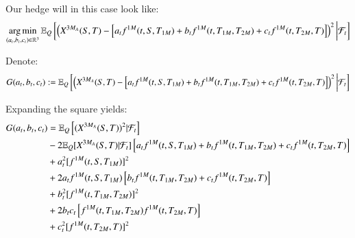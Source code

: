 
Our hedge will in this case look like: 
\begin{align*}
\operatorname*{arg\,min}\limits_{(a_{t}, b_{t}, c_{t})\in \mathbb{R}^{3}}\mathbb{E}_{Q}\left[
\left(
X^{3M_{A}}(S,T)- \left[
a_{t}f^{1M}(t,S,T_{1M}) + 
b_{t}f^{1M}(t,T_{1M}, T_{2M}) + 
c_{t}f^{1M}(t,T_{2M}, T)
\right]
\right)^{2}
\bigg{|}\mathcal{F}_{t}
\right]
\end{align*}

Denote: 
\begin{align*}
G(a_{t}, b_{t}, c_{t}) := 
\mathbb{E}_{Q}\left[
\left(
X^{3M_{A}}(S,T)- \left[
a_{t}f^{1M}(t,S,T_{1M}) + 
b_{t}f^{1M}(t,T_{1M}, T_{2M}) + 
c_{t}f^{1M}(t,T_{2M}, T)
\right]
\right)^{2}
\bigg{|}\mathcal{F}_{t}
\right]
\end{align*} 

Expanding the square yields: 
\begin{align*}
G(a_{t}, b_{t}, c_{t}) 
&= 
\mathbb{E}_{Q}\left[(X^{3M_{A}}(S,T))^{2}|\mathcal{F}_{t} \right] \\
&-2\mathbb{E}_{Q}[X^{3M_{A}}(S,T)|\mathcal{F}_{t}]\left[
a_{t}f^{1M}(t,S,T_{1M}) + 
b_{t}f^{1M}(t,T_{1M}, T_{2M}) + 
c_{t}f^{1M}(t,T_{2M}, T)
\right] \\ 
&+ a_{t}^{2}[f^{1M}(t,S,T_{1M})]^{2} \\ 
&+ 2a_{t}f^{1M}(t,S,T_{1M})\left[
b_{t}f^{1M}(t,T_{1M}, T_{2M}) + 
c_{t}f^{1M}(t,T_{2M}, T)
\right] \\ 
&+ b_{t}^{2}[f^{1M}(t,T_{1M}, T_{2M})]^{2} \\ 
&+ 2b_{t}c_{t}\left[
f^{1M}(t,T_{1M}, T_{2M})f^{1M}(t,T_{2M}, T)
\right] \\ 
&+ c_{t}^{2}[f^{1M}(t,T_{2M}, T)]^{2}
\end{align*} 

